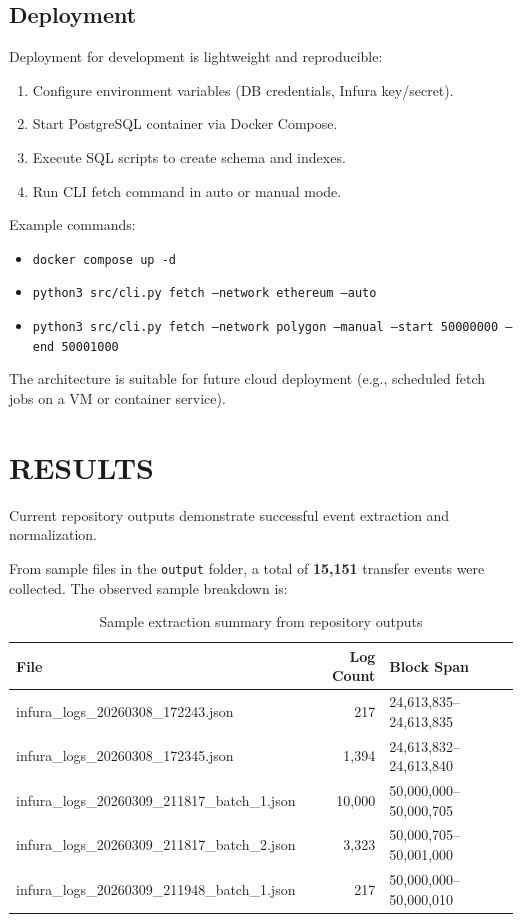 \documentclass[a4paper,12pt]{report}
\begin{document}
\section{Deployment}
Deployment for development is lightweight and reproducible:
\begin{enumerate}
\item Configure environment variables (DB credentials, Infura key/secret).
\item Start PostgreSQL container via Docker Compose.
\item Execute SQL scripts to create schema and indexes.
\item Run CLI fetch command in auto or manual mode.
\end{enumerate}

Example commands:
\begin{itemize}
\item \texttt{docker compose up -d}
\item \texttt{python3 src/cli.py fetch --network ethereum --auto}
\item \texttt{python3 src/cli.py fetch --network polygon --manual --start 50000000 --end 50001000}
\end{itemize}

The architecture is suitable for future cloud deployment (e.g., scheduled fetch jobs on a VM or
container service).

\chapter{RESULTS}
Current repository outputs demonstrate successful event extraction and normalization.

From sample files in the \texttt{output} folder, a total of \textbf{15,151} transfer events were collected.
The observed sample breakdown is:

\begin{table}[h!]
\centering
\caption{Sample extraction summary from repository outputs}
\begin{tabular}{|l|r|l|}
\hline
\textbf{File} & \textbf{Log Count} & \textbf{Block Span} \\\hline
infura\_logs\_20260308\_172243.json & 217 & 24,613,835--24,613,835 \\\hline
infura\_logs\_20260308\_172345.json & 1,394 & 24,613,832--24,613,840 \\\hline
infura\_logs\_20260309\_211817\_batch\_1.json & 10,000 & 50,000,000--50,000,705 \\\hline
infura\_logs\_20260309\_211817\_batch\_2.json & 3,323 & 50,000,705--50,001,000 \\\hline
infura\_logs\_20260309\_211948\_batch\_1.json & 217 & 50,000,000--50,000,010 \\\hline
\end{tabular}
\end{table}
\end{document}
